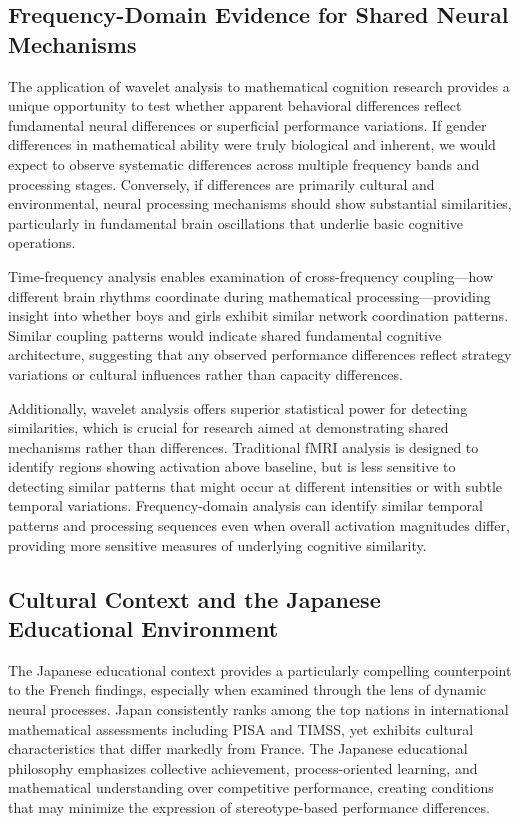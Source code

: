 \documentclass[pdflatex,sn-nature]{sn-jnl}%
\theoremstyle{thmstyleone}%
\theoremstyle{thmstyletwo}%
\theoremstyle{thmstylethree}%
\begin{document}
\subsection{Frequency-Domain Evidence for Shared Neural Mechanisms}
The application of wavelet analysis to mathematical cognition research provides a unique opportunity to test whether apparent behavioral differences reflect fundamental neural differences or superficial performance variations. If gender differences in mathematical ability were truly biological and inherent, we would expect to observe systematic differences across multiple frequency bands and processing stages. Conversely, if differences are primarily cultural and environmental, neural processing mechanisms should show substantial similarities, particularly in fundamental brain oscillations that underlie basic cognitive operations.

Time-frequency analysis enables examination of cross-frequency coupling—how different brain rhythms coordinate during mathematical processing—providing insight into whether boys and girls exhibit similar network coordination patterns\cite{canolty2006high,varela2001brainweb}. Similar coupling patterns would indicate shared fundamental cognitive architecture, suggesting that any observed performance differences reflect strategy variations or cultural influences rather than capacity differences.

Additionally, wavelet analysis offers superior statistical power for detecting similarities, which is crucial for research aimed at demonstrating shared mechanisms rather than differences. Traditional fMRI analysis is designed to identify regions showing activation above baseline, but is less sensitive to detecting similar patterns that might occur at different intensities or with subtle temporal variations. Frequency-domain analysis can identify similar temporal patterns and processing sequences even when overall activation magnitudes differ, providing more sensitive measures of underlying cognitive similarity.


\subsection{Cultural Context and the Japanese Educational Environment}
The Japanese educational context provides a particularly compelling counterpoint to the French findings, especially when examined through the lens of dynamic neural processes. Japan consistently ranks among the top nations in international mathematical assessments including PISA and TIMSS, yet exhibits cultural characteristics that differ markedly from France\cite{mullis2020timss}. The Japanese educational philosophy emphasizes collective achievement, process-oriented learning, and mathematical understanding over competitive performance, creating conditions that may minimize the expression of stereotype-based performance differences.
\end{document}
